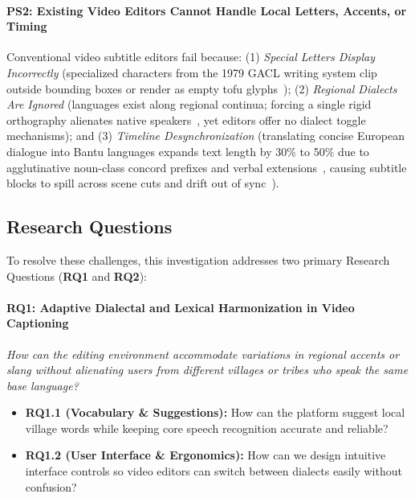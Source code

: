 \documentclass[conference]{IEEEtran}
\begin{document}
\paragraph{\textbf{PS2: Existing Video Editors Cannot Handle Local Letters, Accents, or Timing}}
Conventional video subtitle editors fail because: (1) \textit{Special Letters Display Incorrectly} (specialized characters from the 1979 GACL writing system clip outside bounding boxes or render as empty tofu glyphs~\cite{tadadjeu1979alphabet, w3c2019webvtt}); (2) \textit{Regional Dialects Are Ignored} (languages exist along regional continua; forcing a single rigid orthography alienates native speakers~\cite{tadadjeu1979alphabet}, yet editors offer no dialect toggle mechanisms); and (3) \textit{Timeline Desynchronization} (translating concise European dialogue into Bantu languages expands text length by 30\% to 50\% due to agglutinative noun-class concord prefixes and verbal extensions~\cite{tadadjeu1979alphabet}, causing subtitle blocks to spill across scene cuts and drift out of sync~\cite{w3c2019webvtt}).

\subsection{Research Questions}
\label{sec:intro:rq}

To resolve these challenges, this investigation addresses two primary Research Questions (\textbf{RQ1} and \textbf{RQ2}):

\paragraph{\textbf{RQ1: Adaptive Dialectal and Lexical Harmonization in Video Captioning}}
\textit{How can the editing environment accommodate variations in regional accents or slang without alienating users from different villages or tribes who speak the same base language?}
\begin{itemize}
    \item \textbf{RQ1.1 (Vocabulary \& Suggestions):} How can the platform suggest local village words while keeping core speech recognition accurate and reliable?
    \item \textbf{RQ1.2 (User Interface \& Ergonomics):} How can we design intuitive interface controls so video editors can switch between dialects easily without confusion?
\end{itemize}
\end{document}
